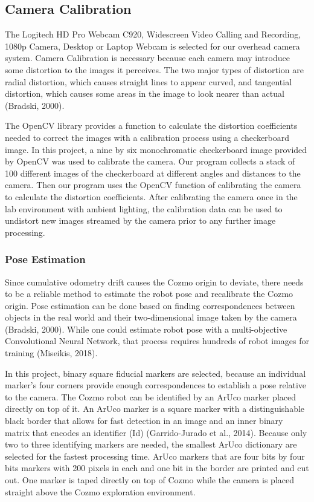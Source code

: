 \documentclass[man]{apa6}
\begin{document}
\subsection{Camera Calibration}
The Logitech HD Pro Webcam C920, Widescreen Video Calling and Recording, 1080p Camera, Desktop or Laptop Webcam is selected for our overhead camera system. Camera Calibration is necessary because each camera may introduce some distortion to the images it perceives. The two major types of distortion are radial distortion, which causes straight lines to appear curved, and tangential distortion, which causes some areas in the image to look nearer than actual (Bradski, 2000). 

The OpenCV library provides a function to calculate the distortion coefficients needed to correct the images with a calibration process using a checkerboard image. In this project, a nine by six monochromatic checkerboard image provided by OpenCV was used to calibrate the camera. Our program collects a stack of 100 different images of the checkerboard at different angles and distances to the camera. Then our program uses the OpenCV function of calibrating the camera to calculate the distortion coefficients. 
After calibrating the camera once in the lab environment with ambient lighting, the calibration data can be used to undistort new images streamed by the camera prior to any further image processing.

\subsubsection{Pose Estimation}

Since cumulative odometry drift causes the Cozmo origin to deviate, there needs to be a reliable method to estimate the robot pose and recalibrate the Cozmo origin. Pose estimation can be done based on finding correspondences between objects in the real world and their two-dimensional image taken by the camera (Bradski, 2000). While one could estimate robot pose with a multi-objective Convolutional Neural Network, that process requires hundreds of robot images for training (Miseikis, 2018).

In this project, binary square fiducial markers are selected, because an individual marker’s four corners provide enough correspondences to establish a pose relative to the camera. The Cozmo robot can be identified by an ArUco marker placed directly on top of it. An ArUco marker is a square marker with a distinguishable black border that allows for fast detection in an image and an inner binary matrix that encodes an identifier (Id) (Garrido-Jurado et al., 2014). Because only two to three identifying markers are needed, the smallest ArUco dictionary are selected for the fastest processing time. ArUco markers that are four bits by four bits markers with 200 pixels in each and one bit in the border are printed and cut out. One marker is taped directly on top of Cozmo while the camera is placed straight above the Cozmo exploration environment.
\end{document}
